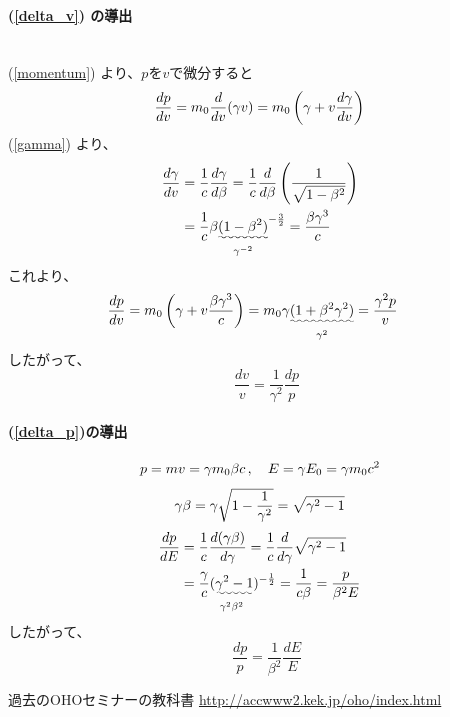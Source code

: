 \documentclass[10pt,a4paper]{ltjsarticle}
\begin{document}
\paragraph{(\ref{delta_v}) の導出} \leavevmode\\

(\ref{momentum}) より、$p$を$v$で微分すると
%
\begin{equation}
  \frac{dp}{dv} = m_0\frac{d}{dv}(\gamma v)
  = m_0 \left(\gamma + v \frac{d\gamma}{dv}\right) \notag
\end{equation}
%
(\ref{gamma}) より、
%
\begin{align}
  \frac{d\gamma}{dv} & = \frac{1}{c}\frac{d\gamma}{d\beta}= \frac{1}{c}\frac{d}{d\beta}\left(\frac{1}{\sqrt{1-\beta^2}}\right) \notag \\
  & = \frac{1}{c} \beta \underset{\gamma^{-2}}{\uwave{(1-\beta^2)}}^{-\frac{3}{2}} = \frac{\beta \gamma^3}{c} \notag
\end{align}
%
これより、
\begin{align}
  \frac{dp}{dv} & = m_0 \left(\gamma + v \frac{\beta \gamma^3}{c}\right)
  = m_0 \gamma \underset{\gamma^2}{\uwave{(1 + \beta^2 \gamma^2)}}
  = \frac{\gamma^2 p}{v} \notag
\end{align}
%
したがって、
%
\begin{equation}
  \quad \frac{dv}{v} = \frac{1}{\gamma^2}\frac{dp}{p}
  \label{dv_dp}
\end{equation}
%
\paragraph{(\ref{delta_p})の導出}
%
\begin{align}
  p = mv = \gamma m_0 \beta c\,  , \quad E = \gamma E_0 = \gamma m_0 c^2 \notag
\end{align}
%
\begin{equation}
  \gamma \beta = \gamma \sqrt{1-\frac{1}{\gamma^2}} \notag = \sqrt{\gamma^2 -1} \notag
\end{equation}
%
\begin{align}
  \frac{dp}{dE} & = \frac{1}{c}\frac{d(\gamma \beta)}{d\gamma} = \frac{1}{c}\frac{d}{d\gamma}\sqrt{\gamma^2 -1} \notag \\
  & = \frac{\gamma}{c} \underset{\gamma^2\beta^2}{(\uwave{\gamma^2 -1}})^{-\frac{1}{2}} = \frac{1}{c\beta}
  = \frac{p}{\beta^2 E}\notag
\end{align}
%
したがって、
%
\begin{equation}
  \quad \frac{dp}{p} = \frac{1}{\beta^2}\frac{dE}{E}
  \label{dp_de}
\end{equation}

%
\begin{thebibliography}{9}
  過去のOHOセミナーの教科書 \url{http://accwww2.kek.jp/oho/index.html}
\end{thebibliography}
%
\end{document}
